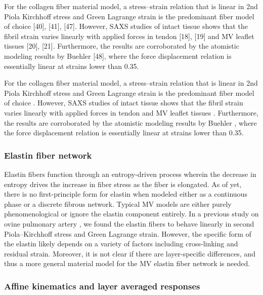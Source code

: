     
    For the collagen fiber material model, a stress–strain relation that is linear in 2nd Piola Kirchhoff stress and Green Lagrange strain is the predominant fiber model of choice [40], [41], [47]. However, SAXS studies of intact tissue shows that the fibril strain varies linearly with applied forces in tendon [18], [19] and MV leaflet tissues [20], [21]. Furthermore, the results are corroborated by the atomistic modeling results by Buehler [48], where the force displacement relation is essentially linear at strains lower than 0.35.
    
    
    For the collagen fiber material model, a stress–strain relation that is linear in 2nd Piola Kirchhoff stress and Green Lagrange strain is the predominant fiber model of choice \cite{sacks_incorporation_2003,lanir_structural_1979,fan_simulation_2014}. However, SAXS studies of intact tissue shows that the fibril strain varies linearly with applied forces in tendon \cite{sasaki_elongation_1996,sasaki_stress_1996} and MV leaflet tissues \cite{liao_relation_2007}. Furthermore, the results are corroborated by the atomistic modeling results by Buehler \cite{buehler_atomistic_2006}, where the force displacement relation is essentially linear at strains lower than 0.35.
    



\subsubsection{Elastin fiber network} \label{sec:elastinconsiderations}

    Elastin fibers function through an entropy-driven process wherein the decrease in entropy drives the increase in fiber stress as the fiber is elongated. As of yet, there is no first-principle form for elastin when modeled either as a continuous phase or a discrete fibrous network. Typical MV models are either purely phenomenological or ignore the elastin component entirely. In a previous study on ovine pulmonary artery \cite{fata_insights_2014}, we found the elastin fibers to behave linearly in second Piola–Kirchhoff stress and Green Lagrange strain. However, the specific form of the elastin likely depends on a variety of factors including cross-linking and residual strain. Moreover, it is not clear if there are layer-specific differences, and thus a more general material model for the MV elastin fiber network is needed.




\subsubsection{Affine kinematics and layer averaged responses}


